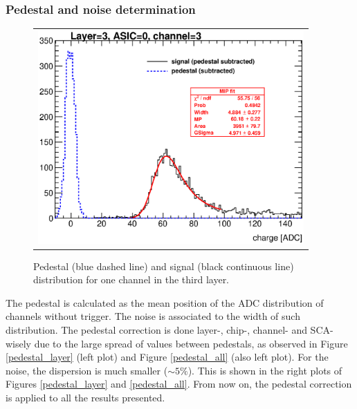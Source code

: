 \documentclass[a4paper,11pt]{article}
\begin{document}
\subsubsection{Pedestal and noise determination}
\label{sec:pedestal}


\begin{figure}[!t]
  \centering
  \begin{tabular}{l}
    \includegraphics[width=4in]{../figs/mip_pedestal_example.eps}
  \end{tabular}
  \caption{Pedestal (blue dashed line) and signal (black continuous line) distribution for one channel in the third layer.}
\label{signal_pedestal}
\end{figure}

The pedestal is calculated as the mean position of
the ADC distribution of channels without trigger. The noise is
associated to the width of such distribution.
The pedestal correction is done layer-, chip-, channel- and SCA-wisely due to the large spread of values between pedestals, as observed in 
Figure \ref{pedestal_layer} (left plot) and Figure \ref{pedestal_all} (also left plot).
For the noise, the dispersion is much smaller ($\sim 5 \%$). This is shown in the right plots of Figures \ref{pedestal_layer} and \ref{pedestal_all}.
From now on, the pedestal correction is applied to all the results presented.

\end{document}
